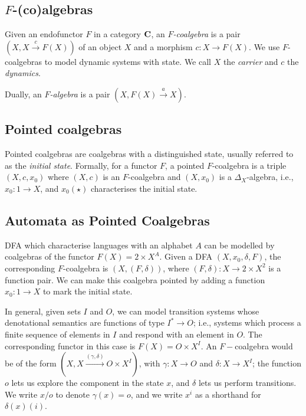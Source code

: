 \subsection{$F$-(co)algebras}
Given an endofunctor $F$ in a category $\AsCategory{C}$, an \emph{$F$-coalgebra} is a pair $(X,X\xrightarrow{c}F(X))$ of an object $X$ and a morphism $c\colon X\rightarrow F(X)$. We use $F$-coalgebras to model dynamic systems with state. We call $X$ the \emph{carrier} and $c$ the \emph{dynamics}.

Dually, an \emph{$F$-algebra} is a pair $(X,F(X)\xrightarrow{a}X)$.

\subsection{Pointed coalgebras}
Pointed coalgebras are coalgebras with a distinguished state, usually referred to as the \emph{initial state}. Formally, for a functor $F$, a pointed $F$-coalgebra is a triple $(X,c, x_0)$ where $(X,c)$ is an $F$-coalgebra and $(X, x_0)$ is a $\Delta_X$-algebra, i.e., $x_0\colon 1\rightarrow X$, and $x_0(\star)$ characterises the initial state.

\subsection{Automata as Pointed Coalgebras}
DFA which characterise languages with an alphabet $A$ can be modelled by coalgebras of the functor $F(X)=2\times X^A$. Given a DFA $(X,x_0,\delta,F)$, the corresponding $F$-coalgebra is $(X,(F,\delta))$, where $(F,\delta)\colon X\rightarrow 2\times X^2$ is a function pair. We can make this coalgebra pointed by adding a function $x_0\colon 1\rightarrow X$ to mark the initial state.

In general, given sets $I$ and $O$, we can model transition systems whose denotational semantics are functions of type $I^*\rightarrow O$; i.e., systems which process a finite sequence of elements in $I$ and respond with an element in $O$. The corresponding functor in this case is $F(X)=O\times X^I$. An $F-$coalgebra would be of the form $(X,X\xrightarrow{(\gamma,\delta)}O\times X^I)$, with $\gamma\colon X\rightarrow O$ and $\delta\colon X\rightarrow X^I$; the function $o$ lets us explore the component in the state $x$, and $\delta$ lets us perform transitions. We write $x/o$ to denote $\gamma(x)=o$, and we write $x^i$ as a shorthand for $\delta(x)(i)$. 

